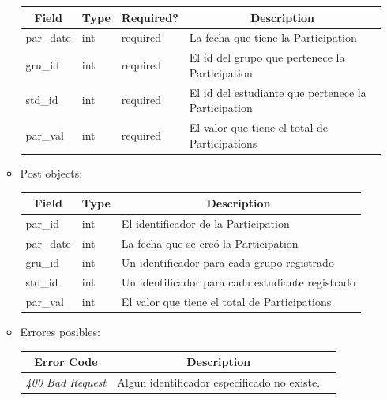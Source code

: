 \documentclass{article}
\begin{document}
\begin{enumerate}
\begin{itemize}
\begin{table}[H]
\begin{tabular}{|l|l|l|l|}
        \multicolumn{1}{|c|}{\textbf{Field}} &
        \multicolumn{1}{c|}{\textbf{Type}} &
        \multicolumn{1}{c|}{\textbf{Required?}} &
        \multicolumn{1}{c|}{\textbf{Description}} \\ \hline par\_date & int &
        required & La fecha que tiene la Participation \\ \hline gru\_id & int &
        required & El id del grupo que pertenece la Participation \\ \hline
        std\_id & int & required & El id del estudiante que pertenece la
        Participation \\ \hline par\_val & int & required & El valor que tiene
        el total de Participations \\ \hline \end{tabular} \end{table}
        \item Post objects:
        \begin{table}[H] \centering \begin{tabular}{|l|l|l|} \hline
        \multicolumn{1}{|c|}{\textbf{Field}} &
        \multicolumn{1}{c|}{\textbf{Type}} &
        \multicolumn{1}{c|}{\textbf{Description}} \\ \hline par\_id & int & El
        identificador de la Participation \\ \hline par\_date & int & La fecha
        que se creó la Participation \\ \hline gru\_id & int & Un identificador
        para cada grupo registrado \\ \hline std\_id & int & Un identificador
        para cada estudiante registrado \\ \hline par\_val & int & El valor que
        tiene el total de Participations \\ \hline \end{tabular} \end{table}
        \item Errores posibles: \begin{table}[H] \centering
        \begin{tabular}{|c|c|l|} \hline \textbf{Error Code} &
        \textbf{Description} \\ \hline \textit{400 Bad Request} & Algun
        identificador especificado no existe. \\ \hline \end{tabular}
        \end{table}
    \end{itemize}


\end{enumerate}
\end{document}
